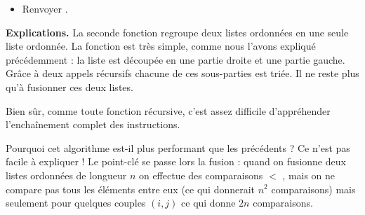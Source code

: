 \documentclass[11pt,class=report,crop=false]{standalone}
\begin{document}
\begin{activite}
\begin{algorithme}
\begin{itemize}
			\item Renvoyer .
			
		\end{itemize}
	\end{algorithme} 
	
	
%	
%		
%		
%		
%		



\bigskip

\textbf{Explications.}
La seconde fonction  regroupe deux listes ordonnées en une seule liste ordonnée.
La fonction  est très simple, comme nous l'avons expliqué précédemment : la liste est découpée en une partie droite et une partie gauche. Grâce à deux appels récursifs chacune de ces sous-parties est triée. Il ne reste plus qu'à fusionner ces deux listes. 


Bien sûr, comme toute fonction récursive, c'est assez difficile d'appréhender l'enchaînement complet des instructions.



Pourquoi cet algorithme est-il plus performant que les précédents ? Ce n'est pas facile à expliquer ! Le point-clé se passe lors la fusion : quand on fusionne deux listes ordonnées de longueur $n$ on effectue des comparaisons  $<$ , mais on ne compare pas tous les éléments entre eux (ce qui donnerait $n^2$ comparaisons) mais seulement pour quelques couples $(i,j)$ ce qui donne $2n$ comparaisons.


\end{activite}
\end{document}
